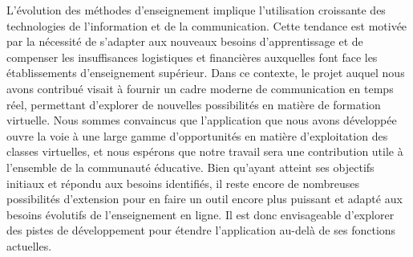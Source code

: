 \conclusion
L'évolution des méthodes d'enseignement implique l'utilisation croissante des technologies de l'information et de la communication. 
Cette tendance est motivée par la nécessité de s'adapter aux nouveaux besoins d'apprentissage et de compenser les insuffisances logistiques et 
financières auxquelles font face les établissements d'enseignement supérieur. Dans ce contexte, 
le projet auquel nous avons contribué visait à fournir un cadre moderne de communication en temps réel, 
permettant d'explorer de nouvelles possibilités en matière de formation virtuelle. 
Nous sommes convaincus que l'application que nous avons développée ouvre la voie à une large gamme d'opportunités en matière d'exploitation des classes virtuelles, 
et nous espérons que notre travail sera une contribution utile à l'ensemble de la communauté éducative.  
Bien qu'ayant atteint ses objectifs initiaux et répondu aux besoins identifiés, il reste encore de nombreuses possibilités d'extension pour en faire un outil encore plus puissant et adapté aux besoins évolutifs de l'enseignement en ligne. 
Il est donc envisageable d'explorer des pistes de développement pour étendre l'application au-delà de ses fonctions actuelles.